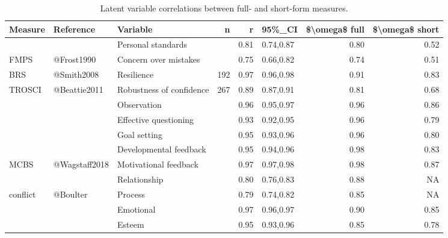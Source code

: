 \documentclass[a4paper,]{book}
\begin{document}
\begin{table}

\caption{\label{tab:short-measure-correlations}Latent variable correlations between full- and short-form measures.}
\centering
\begin{tabular}[t]{lllrrlrr}
\toprule
Measure & Reference & Variable & n & r & 95\%\_CI & \$\textbackslash{}omega\$ full & \$\textbackslash{}omega\$ short\\
\midrule
 &  & Personal standards &  & 0.81 & 0.74,0.87 & 0.80 & 0.52\\
\cmidrule{3-3}
\cmidrule{5-8}
\multirow[t]{-2}{*}{\raggedright\arraybackslash FMPS} & \multirow[t]{-2}{*}{\raggedright\arraybackslash @Frost1990} & Concern over mistakes & \multirow[t]{-2}{*}{\raggedleft\arraybackslash 120} & 0.75 & 0.66,0.82 & 0.74 & 0.51\\
\cmidrule{1-8}
BRS & @Smith2008 & Resilience & 192 & 0.97 & 0.96,0.98 & 0.91 & 0.83\\
\cmidrule{1-8}
TROSCI & @Beattie2011 & Robustness of confidence & 267 & 0.89 & 0.87,0.91 & 0.81 & 0.68\\
\cmidrule{1-8}
 &  & Observation &  & 0.96 & 0.95,0.97 & 0.96 & 0.86\\
\cmidrule{3-3}
\cmidrule{5-8}
 &  & Effective questioning &  & 0.93 & 0.92,0.95 & 0.96 & 0.79\\
\cmidrule{3-3}
\cmidrule{5-8}
 &  & Goal setting &  & 0.95 & 0.93,0.96 & 0.96 & 0.80\\
\cmidrule{3-3}
\cmidrule{5-8}
 &  & Developmental feedback &  & 0.95 & 0.94,0.96 & 0.98 & 0.83\\
\cmidrule{3-3}
\cmidrule{5-8}
\multirow[t]{-5}{*}{\raggedright\arraybackslash MCBS} & \multirow[t]{-5}{*}{\raggedright\arraybackslash @Wagstaff2018} & Motivational feedback & \multirow[t]{-5}{*}{\raggedleft\arraybackslash 263} & 0.97 & 0.97,0.98 & 0.98 & 0.87\\
\cmidrule{1-8}
 &  & Relationship &  & 0.80 & 0.76,0.83 & 0.88 & NA\\
\cmidrule{3-3}
\cmidrule{5-8}
\multirow[t]{-2}{*}{\raggedright\arraybackslash conflict} & \multirow[t]{-2}{*}{\raggedright\arraybackslash @Boulter} & Process & \multirow[t]{-2}{*}{\raggedleft\arraybackslash 384} & 0.79 & 0.74,0.82 & 0.85 & NA\\
\cmidrule{1-8}
 &  & Emotional &  & 0.97 & 0.96,0.97 & 0.90 & 0.85\\
\cmidrule{3-3}
\cmidrule{5-8}
 &  & Esteem &  & 0.95 & 0.93,0.96 & 0.85 & 0.78\\
\cmidrule{3-3}
\cmidrule{5-8}

\end{tabular}
\end{table}
\end{document}
